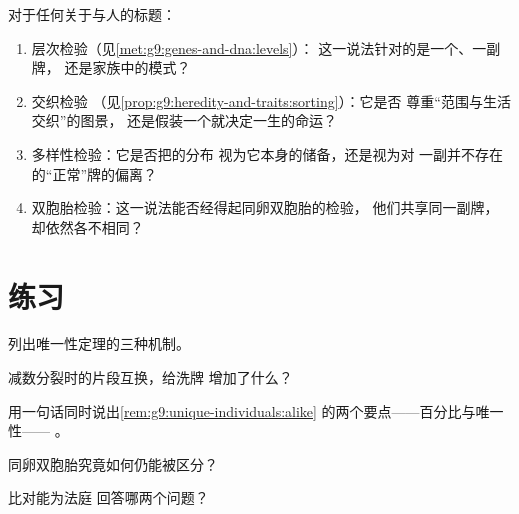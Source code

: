 \begin{method}[审核“基因”相关的说法]\label{met:g9:unique-individuals:claims}
对于任何关于与人的标题：
\begin{enumerate}
  \item 层次检验（见\cref{met:g9:genes-and-dna:levels}）：
        这一说法针对的是一个、一副牌，
        还是家族中的模式？
  \item 交织检验
        （见\cref{prop:g9:heredity-and-traits:sorting}）：它是否
        尊重“范围与生活交织”的图景，
        还是假装一个就决定一生的命运？
  \item 多样性检验：它是否把的分布
        视为它本身的储备，还是视为对
        一副并不存在的“正常”牌的偏离？
  \item 双胞胎检验：这一说法能否经得起同卵双胞胎的检验，
        他们共享同一副牌，却依然各不相同？
\end{enumerate}
\end{method}

\section{练习}

\begin{exercise}[$\star$]\label{exo:g9:unique-individuals:1}
列出唯一性定理的三种机制。
\end{exercise}

\begin{exercise}[$\star$]\label{exo:g9:unique-individuals:2}
减数分裂时的片段互换，给洗牌
增加了什么？
\end{exercise}

\begin{exercise}[$\star$]\label{exo:g9:unique-individuals:3}
用一句话同时说出\cref{rem:g9:unique-individuals:alike}
的两个要点——百分比与唯一性——
。
\end{exercise}

\begin{exercise}[$\star$]\label{exo:g9:unique-individuals:4}
同卵双胞胎究竟如何仍能被区分？
\end{exercise}

\begin{exercise}[$\star$]\label{exo:g9:unique-individuals:5}
 比对能为法庭
回答哪两个问题？
\end{exercise}

